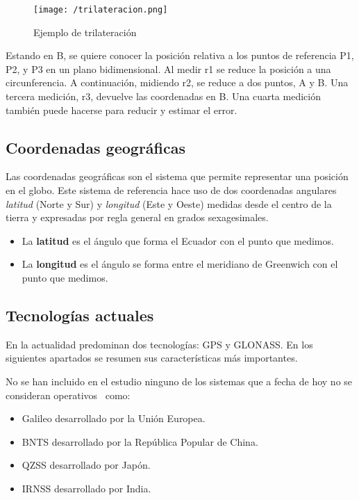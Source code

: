\begin{figure}[!h]
  \begin{center}
    \texttt{[image: /trilateracion.png]}
    \caption{Ejemplo de trilateración}
    \label{fig:trilateracion}
  \end{center}
\end{figure}

Estando en B, se quiere conocer la posición relativa a los puntos de referencia P1, P2, y P3 en un
plano bidimensional. Al medir r1 se reduce la posición a una circunferencia. A continuación,
midiendo r2, se reduce a dos puntos, A y B. Una tercera medición, r3, devuelve las coordenadas en
B. Una cuarta medición también puede hacerse para reducir y estimar el error.

\subsection{Coordenadas geográficas}
\label{sec:coordenadas}

Las coordenadas geográficas son el sistema que permite representar una posición en el globo. Este
sistema de referencia hace uso de dos coordenadas angulares \emph{latitud} (Norte y Sur) y
\emph{longitud} (Este y Oeste) medidas desde el centro de la tierra y expresadas por regla general
en grados sexagesimales.

\begin{itemize}
  \item La \textbf{latitud} es el ángulo que forma el Ecuador con el punto que medimos.
  \item La \textbf{longitud} es el ángulo se forma entre el meridiano de Greenwich con el punto que
    medimos.
\end{itemize}

\subsection{Tecnologías actuales}
\label{sec:tecnologiasActuales}

En la actualidad predominan dos tecnologías: \acf{GPS} y \acf{GLONASS}. En los siguientes apartados
se resumen sus características más importantes.

No se han incluido en el estudio ninguno de los sistemas que a fecha de hoy no se consideran
operativos~\cite{SPSA} como:

\begin{itemize}
  \item Galileo desarrollado por la Unión Europea.
  \item \acf{BNTS} desarrollado por la República Popular de China.
  \item \acf{QZSS} desarrollado por Japón.
  \item \acf{IRNSS} desarrollado por India.
\end{itemize}

